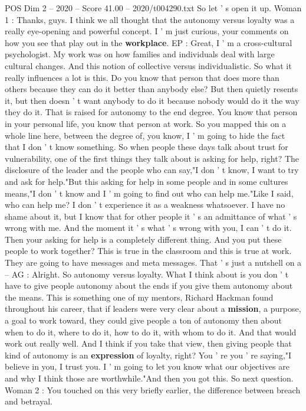 \begin{textsample}{POS Dim 2 – 2020 – Score 41.00 – 2020/t004290.txt}
So let ' s open it up.
Woman 1 : Thanks, guys.
I think we all thought that the autonomy versus loyalty was a really eye-opening and powerful concept.
I ' m just curious, your comments on how you see that play out in the \textbf{workplace}.
EP : Great, I ' m a cross-cultural psychologist.
My work was on how families and individuals deal with large cultural changes.
And this notion of collective versus individualistic.
So what it really influences a lot is this.
Do you know that person that does more than others because they can do it better than anybody else?
But then quietly resents it, but then doesn ' t want anybody to do it because nobody would do it the way they do it.
That is raised for autonomy to the end degree.
You know that person in your personal life, you know that person at work.
So you mapped this on a whole line here, between the degree of, you know, I ' m going to hide the fact that I don ' t know something.
So when people these days talk about trust for vulnerability, one of the first things they talk about is asking for help, right?
The disclosure of the leader and the people who can say,"I don ' t know, I want to try and ask for help."But this asking for help in some people and in some cultures means,"I don ' t know and I ' m going to find out who can help me."Like I said, who can help me?
I don ' t experience it as a weakness whatsoever.
I have no shame about it, but I know that for other people it ' s an admittance of what ' s wrong with me.
And the moment it ' s what ' s wrong with you, I can ' t do it.
Then your asking for help is a completely different thing.
And you put these people to work together?
This is true in the classroom and this is true at work.
They are going to have messages and meta messages.
That ' s just a nutshell on a -- AG : Alright.
So autonomy versus loyalty.
What I think about is you don ' t have to give people autonomy about the ends if you give them autonomy about the means.
This is something one of my mentors, Richard Hackman found throughout his career, that if leaders were very clear about a \textbf{mission}, a purpose, a goal to work toward, they could give people a ton of autonomy then about when to do it, where to do it, how to do it, with whom to do it.
And that would work out really well.
And I think if you take that view, then giving people that kind of autonomy is an \textbf{expression} of loyalty, right?
You ' re you ' re saying,"I believe in you, I trust you.
I ' m going to let you know what our objectives are and why I think those are worthwhile."And then you got this.
So next question.
Woman 2 : You touched on this very briefly earlier, the difference between breach and betrayal.

\end{textsample}
